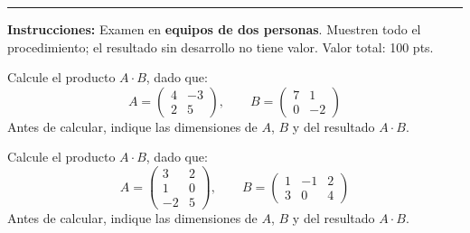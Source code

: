 \documentclass[12pt]{article}
\begin{document}
\vspace{0.2cm}
\noindent\rule{\textwidth}{0.8pt}
\vspace{0.15cm}

\noindent\textbf{Instrucciones:} Examen en \textbf{equipos de dos personas}. Muestren todo el procedimiento; el resultado sin desarrollo no tiene valor. Valor total: 100 pts.

\vspace{0.5cm}


\begin{ejercicio}[30 pts.]
Calcule el producto $A \cdot B$, dado que:
\[
A = \begin{pmatrix} 4 & -3 \\ 2 & 5 \end{pmatrix}, \qquad
B = \begin{pmatrix} 7 & 1 \\ 0 & -2 \end{pmatrix}
\]
Antes de calcular, indique las dimensiones de $A$, $B$ y del resultado $A\cdot B$.
\end{ejercicio}


\vspace{6cm}

\begin{ejercicio}[30 pts.]
Calcule el producto $A \cdot B$, dado que:
\[
A = \begin{pmatrix} 3 & 2 \\ 1 & 0 \\ -2 & 5 \end{pmatrix}, \qquad
B = \begin{pmatrix} 1 & -1 & 2 \\ 3 & 0 & 4 \end{pmatrix}
\]
Antes de calcular, indique las dimensiones de $A$, $B$ y del resultado $A\cdot B$.
\end{ejercicio}
\end{document}
